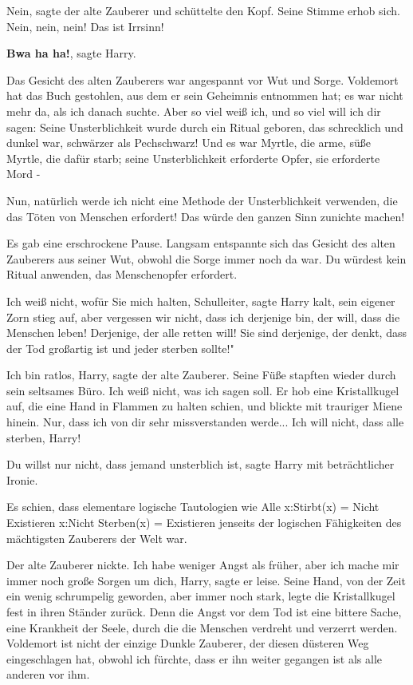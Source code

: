 \glqq{}Nein\grqq{}, sagte der alte Zauberer und schüttelte den Kopf. Seine Stimme
erhob sich. \glqq{}Nein, nein, nein! Das ist Irrsinn!\grqq{}

\glqq{}\textbf{Bwa ha ha!}\grqq{}, sagte Harry.

Das Gesicht des alten Zauberers war angespannt vor Wut und Sorge. \glqq
Voldemort hat das Buch gestohlen, aus dem er sein Geheimnis entnommen hat; es
war nicht mehr da, als ich danach suchte. Aber so viel weiß ich, und so viel
will ich dir sagen: Seine Unsterblichkeit wurde durch ein Ritual geboren, das
schrecklich und dunkel war, schwärzer als Pechschwarz! Und es war Myrtle, die
arme, süße Myrtle, die dafür starb; seine Unsterblichkeit erforderte Opfer, sie
erforderte Mord -\grqq{}

\glqq{}Nun, natürlich werde ich nicht eine Methode der Unsterblichkeit verwenden,
die das Töten von Menschen erfordert! Das würde den ganzen Sinn zunichte
machen!\grqq{}

Es gab eine erschrockene Pause. Langsam entspannte sich das Gesicht des alten
Zauberers aus seiner Wut, obwohl die Sorge immer noch da war. \glqq{}Du würdest
kein Ritual anwenden, das Menschenopfer erfordert.\grqq{}

\glqq{}Ich weiß nicht, wofür Sie mich halten, Schulleiter\grqq{}, sagte Harry
kalt, sein eigener Zorn stieg auf, \glqq{}aber vergessen wir nicht, dass ich
derjenige bin, der will, dass die Menschen leben! Derjenige, der alle retten
will! Sie sind derjenige, der denkt, dass der Tod großartig ist und jeder
sterben sollte!"

\glqq{}Ich bin ratlos, Harry\grqq{}, sagte der alte Zauberer. Seine Füße stapften
wieder durch sein seltsames Büro. \glqq{}Ich weiß nicht, was ich sagen
soll.\grqq{} Er hob eine Kristallkugel auf, die eine Hand in Flammen zu halten
schien, und blickte mit trauriger Miene hinein. \glqq{}Nur, dass ich von dir sehr
missverstanden werde... Ich will nicht, dass alle sterben, Harry!\grqq{}

\glqq{}Du willst nur nicht, dass jemand unsterblich ist\grqq{}, sagte Harry mit
beträchtlicher Ironie.

Es schien, dass elementare logische Tautologien wie Alle x:Stirbt(x) = Nicht
Existieren x:Nicht Sterben(x) = Existieren jenseits der logischen Fähigkeiten
des mächtigsten Zauberers der Welt war.

Der alte Zauberer nickte. \glqq{}Ich habe weniger Angst als früher, aber ich
mache mir immer noch große Sorgen um dich, Harry\grqq{}, sagte er leise. Seine
Hand, von der Zeit ein wenig schrumpelig geworden, aber immer noch stark, legte
die Kristallkugel fest in ihren Ständer zurück. \glqq{}Denn die Angst vor dem Tod
ist eine bittere Sache, eine Krankheit der Seele, durch die die Menschen
verdreht und verzerrt werden. Voldemort ist nicht der einzige Dunkle Zauberer,
der diesen düsteren Weg eingeschlagen hat, obwohl ich fürchte, dass er ihn
weiter gegangen ist als alle anderen vor ihm.\grqq{}

